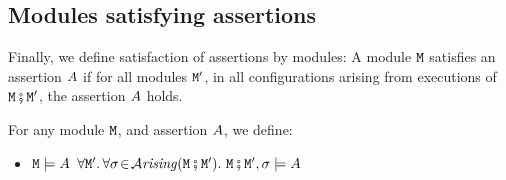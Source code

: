 \subsection{Modules satisfying assertions}

Finally, we define satisfaction of assertions by modules: A module $\M$ satisfies an assertion $\A$ if for all modules $\M'$, in all configurations arising from executions of $\M\mkpair\M'$, the assertion $\A$ holds.

\begin{definition}
\label{def:module_satisfies}
For any module $\M$, and  assertion $\A$, we define:
\begin{itemize}
\item
$\M \models \A$ \IFF  $\forall \M'.\, \forall \sigma\!\in\!\Arising{\M\mkpair\M'}.\   \M\mkpair\M', \sigma \models \A$
\end{itemize}
\end{definition}

 




